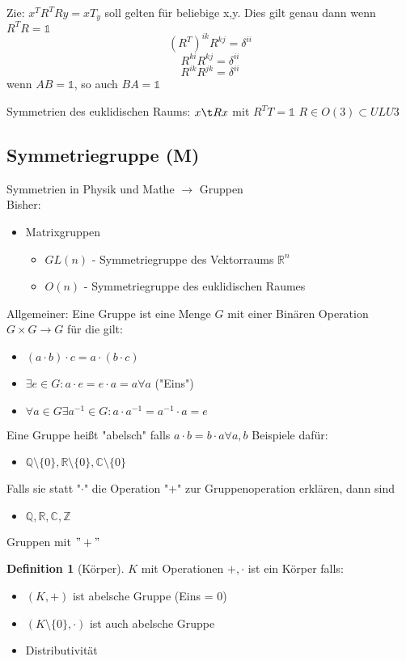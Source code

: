 \documentclass[a4paper]{scrartcl}
\DeclareMathOperator{\Exists}{\exists}
\DeclareMathOperator{\Forall}{\forall}
\theoremstyle{definition}
\newtheorem{defn}{Definition}
\theoremstyle{plain}
\theoremstyle{remark}
\theoremstyle{remark}
\begin{document}
Zie: $x^T R^T Ry = x T_y$ soll gelten für beliebige x,y. Dies gilt genau dann wenn $R^{T} R = \mathbb{1}$
\[(R^{T})^{ik} R^{kj} = \delta^{ii}\]
\[R^{ki} R^{kj} = \delta^{ii}\]
\[R^{ik} R^{jk} = \delta^{ii}\]
wenn $AB = \mathbb{1}$, so auch $B A = \mathbb{1}$


Symmetrien des euklidischen Raums:
$x \t R x$ mit $R^{T} T = \mathbb{1}$
$R \in O(3) \subset ULU3$
\subsection{Symmetriegruppe (M)}
\label{sec-6-3}
Symmetrien in Physik und Mathe $\rightarrow$ Gruppen \\
   Bisher:
\begin{itemize}
\item Matrixgruppen
\begin{itemize}
\item $GL(n)$ - Symmetriegruppe des Vektorraums $\mathbb{R}^n$
\item $O(n)$ - Symmetriegruppe des euklidischen Raumes
\end{itemize}
\end{itemize}

Allgemeiner: Eine Gruppe ist eine Menge $G$ mit einer Binären Operation $G \times G \to G$ für die gilt:
\begin{itemize}
\item $(a \cdot b) \cdot c = a \cdot (b\cdot c)$
\item $\Exists e \in G: a\cdot e = e\cdot a = a \Forall a$ ("Eins")
\item $\Forall a\in G \Exists a^{-1} \in G: a\cdot a^{-1} = a^{-1} \cdot a = e$
\end{itemize}

Eine Gruppe heißt "abelsch" falls $a\cdot b = b\cdot a \Forall a,b$
Beispiele dafür:
\begin{itemize}
\item $\mathbb{Q}\setminus \{0\}, \mathbb{R} \setminus \{0\}, \mathbb{C} \setminus \{0\}$
\end{itemize}
Falls sie statt "$\cdot$" die Operation "$+$" zur Gruppenoperation erklären, dann sind
\begin{itemize}
\item $\mathbb{Q}, \mathbb{R}, \mathbb{C}, \mathbb{Z}$
\end{itemize}
Gruppen mit $"+"$

\begin{defn}[Körper]
$K$ mit Operationen $+,\cdot$ ist ein Körper falls:
\begin{itemize}
\item $(K,+)$ ist abelsche Gruppe (Eins = 0)
\item $(K\setminus\{0\}, \cdot)$ ist auch abelsche Gruppe
\item Distributivität
\end{itemize}
\end{defn}
\end{document}
